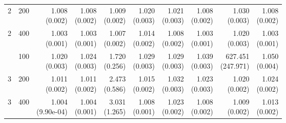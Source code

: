 \begin{table}[p]
{\begin{tabular}{llrrrrrrrr}
2 & 200 & \shortstack{1.008\\(0.002)} & \shortstack{1.008\\(0.002)} & \shortstack{1.009\\(0.002)} & \shortstack{1.020\\(0.003)} & \shortstack{1.021\\(0.003)} & \shortstack{1.008\\(0.002)} & \shortstack{1.030\\(0.003)} & \shortstack{1.008\\(0.002)} \\
2 & 400 & \shortstack{1.003\\(0.001)} & \shortstack{1.003\\(0.001)} & \shortstack{1.007\\(0.002)} & \shortstack{1.014\\(0.002)} & \shortstack{1.008\\(0.002)} & \shortstack{1.003\\(0.001)} & \shortstack{1.020\\(0.003)} & \shortstack{1.003\\(0.001)} \\
\addlinespace
3 & 100 & \shortstack{1.020\\(0.003)} & \shortstack{1.024\\(0.003)} & \shortstack{1.720\\(0.256)} & \shortstack{1.029\\(0.003)} & \shortstack{1.029\\(0.003)} & \shortstack{1.039\\(0.003)} & \shortstack{627.451\\(247.971)} & \shortstack{1.050\\(0.004)} \\
3 & 200 & \shortstack{1.011\\(0.002)} & \shortstack{1.011\\(0.002)} & \shortstack{2.473\\(0.586)} & \shortstack{1.015\\(0.002)} & \shortstack{1.032\\(0.003)} & \shortstack{1.023\\(0.003)} & \shortstack{1.020\\(0.002)} & \shortstack{1.024\\(0.002)} \\
3 & 400 & \shortstack{1.004\\(9.90e-04)} & \shortstack{1.004\\(0.001)} & \shortstack{3.031\\(1.265)} & \shortstack{1.008\\(0.001)} & \shortstack{1.023\\(0.002)} & \shortstack{1.008\\(0.002)} & \shortstack{1.009\\(0.002)} & \shortstack{1.013\\(0.002)} \\

\end{tabular}}
\end{table}
